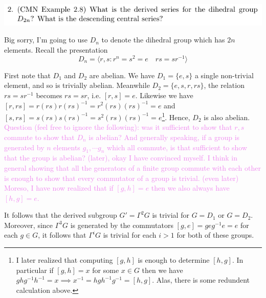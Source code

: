 \documentclass[12pt,letterpaper,boxed]{hmcpset}
\newcommand{\wg}[1]{\textcolor{violet}{#1}}
\newcommand{\inv}{^{-1}}
\begin{document}
\newpage


\begin{problem}
	\includegraphics[scale=0.8]{2.png}
	\hfill
\end{problem}

\begin{solution}
Big sorry, I'm going to use $D_n$ to denote the dihedral group which
has $2n$ elements. Recall the presentation \[
	D_n = \langle 
		r,s : r^n = s^2 = e \quad rs = sr\inv 
	\rangle
\]

First note that $D_1$ and $D_2$ are abelian. 
We have $D_1 = \{ e, s \}$ a single non-trivial element, and so is
trivially abelian. Meanwhile $D_2 = \{ e, s, r, rs \}$, the relation 
$rs = sr\inv$ becomes $rs = sr$, i.e. $[r,s] = e$. Likewise we have 
$[r,rs] = r(rs)r(rs)\inv = r^2 (rs)(rs)\inv = e$ and 
$[s, rs] = s (rs) s (rs)\inv = s^2 (rs) (rs)\inv = e$\footnote{
I later realized that computing $[g,h]$ is enough to determine
$[h,g]$. In particular if $[g,h] = x$ for some $x \in G$ then we have
$ghg\inv h\inv = x \implies x\inv = h g h\inv g\inv = [h,g]$. Alas,
there is some redundent calculation above.
}. Hence, $D_2$ is
also abelian. \wg{Question (feel free to ignore the following): was it sufficient to show that $r,s$
commute to show that $D_n$ is abelian? And generally speaking, if a
group is generated by $n$ elements $g_1, \cdots g_n$ which all
commute, is that sufficient to show that the group is abelian?}
\wg{(later), okay I have convinced myself. I think in general 
showing that all the generators of a finite group commute with each other is
enough to show that every commutator of a group is trivial. 
(even later) Moreso, I have now realized that if $[g,h] = e$ then we
also always have $[h,g] = e$.}

It follows that the
derived subgroup $G' = \Gamma^2 G$ is trivial for $G = D_1$ or $G =
D_2$.
Moreover, since $\Gamma^3 G$ is generated by the commutators $[g, e] = g e
g\inv e = e$ for each $g \in G$, it follows that $\Gamma^i G$ is
trivial for each $i > 1$ for both of these groups.


\end{solution}
\end{document}
